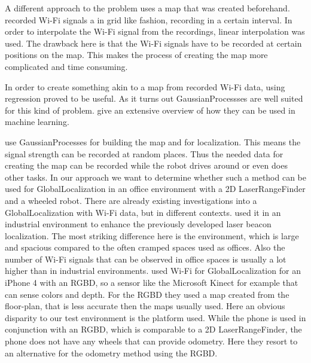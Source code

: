 A different approach to the problem uses a map that was created beforehand. \citet{biswas2010wifi} recorded Wi-Fi signals a in grid like fashion, recording in a certain interval. In order to interpolate the Wi-Fi signal from the recordings, linear interpolation was used. The drawback here is that the Wi-Fi signals have to be recorded at certain positions on the map. This makes the process of creating the map more complicated and time consuming.

In order to create something akin to a map from recorded Wi-Fi data, using regression proved to be useful. As it turns out \Glspl{GaussianProcess}es are well suited for this kind of problem. \citet{Rasmussen:2005:GPM:1162254} give an extensive overview of how they can be used in machine learning. 

\citet{ferris2006gaussian} use \Gls{GaussianProcess}es for building the map and for localization. This means the signal strength can be recorded at random places. Thus the needed data for creating the map can be recorded while the robot drives around or even does other tasks. 
In our approach we want to determine whether such a method can be used for \gls{GlobalLocalization} in an office environment with a 2D \gls{LaserRangeFinder} and a wheeled robot.
There are already existing investigations into a \gls{GlobalLocalization} with Wi-Fi data, but in different contexts. \citet{duvallet2008wifi} used it in an industrial environment to enhance the previously developed laser beacon localization\citep{4209248}. The most striking difference here is the environment, which is large and spacious compared to the often cramped spaces used as offices. Also the number of Wi-Fi signals that can be observed in office spaces is usually a lot higher than in industrial environments.
\citet{DBLP:conf/icra/ItoEKTSB14} used Wi-Fi for \gls{GlobalLocalization} for an iPhone 4 with an \Gls{RGBD}, so a sensor like the Microsoft Kinect for example that can sense colors and depth. For the \Gls{RGBD} they used a map created from the floor-plan, that is less accurate then the maps usually used. Here an obvious disparity to our test environment is the platform used. While the phone is used in conjunction with an \Gls{RGBD}, which is comparable to a 2D \gls{LaserRangeFinder}, the phone does not have any wheels that can provide odometry. Here they resort to an alternative for the odometry method using the \Gls{RGBD}.  